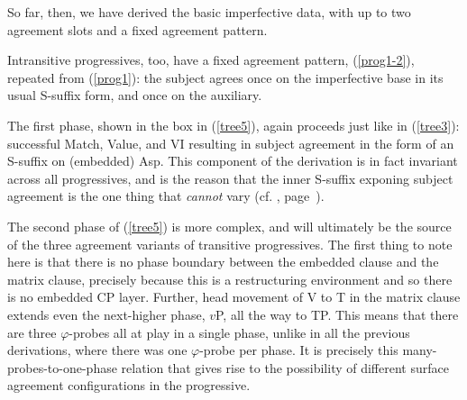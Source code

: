 \documentclass[output=paper
,modfonts
,nonflat]{langsci/langscibook}
\begin{document}
\noindent So far, then, we have derived the basic imperfective data, with up to two agreement slots and a fixed agreement pattern. 

Intransitive progressives, too, have a fixed agreement pattern, (\ref{prog1-2}), repeated from (\ref{prog1}): the subject agrees once on the imperfective base in its usual S-suffix form, and once on the auxiliary. 

\z

\noindent The first phase, shown in the box in (\ref{tree5}), again proceeds just like in (\ref{tree3}): successful Match, Value, and VI resulting in subject agreement in the form of an S-suffix on (embedded) Asp. This component of the derivation is in fact invariant across all progressives, and is the reason that the inner S-suffix exponing subject agreement is the one thing that \textit{cannot} vary (cf. , page~\pageref{tab-kalin:2}). 

The second phase of (\ref{tree5}) is more complex, and will ultimately be the source of the three agreement variants of transitive progressives. The first thing to note here is that there is no phase boundary between the embedded clause and the matrix clause, precisely because this is a restructuring environment and so there is no embedded CP layer. Further, head movement of V to T in the matrix clause extends even the next-higher phase, $v$P, all the way to TP. This means that there are three $\varphi$-probes all at play in a single phase, unlike in all the previous derivations, where there was one $\varphi$-probe per phase. It is precisely this many-probes-to-one-phase relation that gives rise to the possibility of different surface agreement configurations in the progressive.
\end{document}
